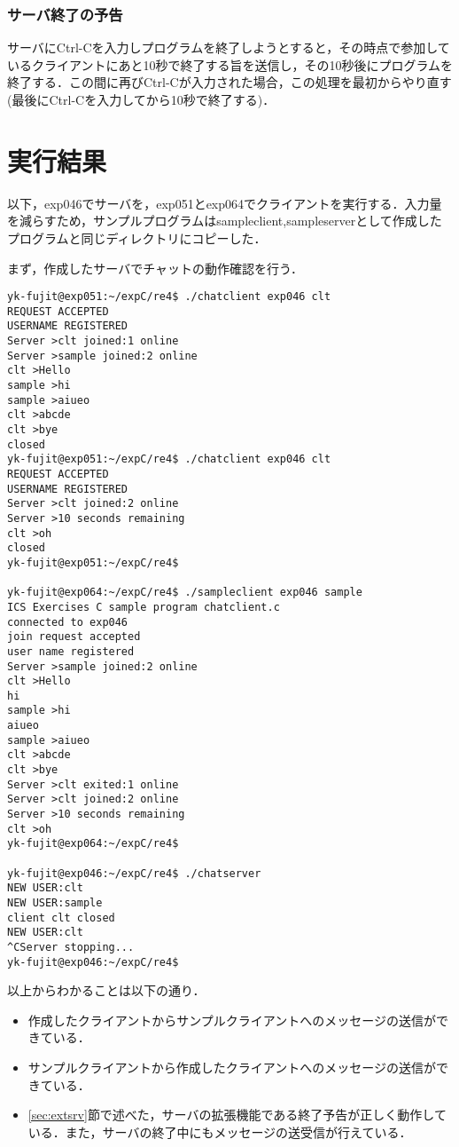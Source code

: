 \documentclass[a4j,10pt,titlepage]{jsarticle}
\begin{document}
\subsubsection{サーバ終了の予告}
サーバにCtrl-Cを入力しプログラムを終了しようとすると，その時点で参加しているクライアントにあと10秒で終了する旨を送信し，その10秒後にプログラムを終了する．この間に再びCtrl-Cが入力された場合，この処理を最初からやり直す(最後にCtrl-Cを入力してから10秒で終了する)．

\section{実行結果}
以下，exp046でサーバを，exp051とexp064でクライアントを実行する．入力量を減らすため，サンプルプログラムはsampleclient,sampleserverとして作成したプログラムと同じディレクトリにコピーした．

まず，作成したサーバでチャットの動作確認を行う．
\begin{verbatim}
yk-fujit@exp051:~/expC/re4$ ./chatclient exp046 clt
REQUEST ACCEPTED
USERNAME REGISTERED
Server >clt joined:1 online
Server >sample joined:2 online
clt >Hello
sample >hi
sample >aiueo
clt >abcde
clt >bye
closed
yk-fujit@exp051:~/expC/re4$ ./chatclient exp046 clt
REQUEST ACCEPTED
USERNAME REGISTERED
Server >clt joined:2 online
Server >10 seconds remaining
clt >oh
closed
yk-fujit@exp051:~/expC/re4$ 

yk-fujit@exp064:~/expC/re4$ ./sampleclient exp046 sample
ICS Exercises C sample program chatclient.c
connected to exp046
join request accepted
user name registered
Server >sample joined:2 online
clt >Hello
hi
sample >hi
aiueo
sample >aiueo
clt >abcde
clt >bye
Server >clt exited:1 online
Server >clt joined:2 online
Server >10 seconds remaining
clt >oh
yk-fujit@exp064:~/expC/re4$ 

yk-fujit@exp046:~/expC/re4$ ./chatserver 
NEW USER:clt
NEW USER:sample
client clt closed
NEW USER:clt
^CServer stopping...
yk-fujit@exp046:~/expC/re4$ 
\end{verbatim}
以上からわかることは以下の通り．
\begin{itemize}
  \item 作成したクライアントからサンプルクライアントへのメッセージの送信ができている．
  \item サンプルクライアントから作成したクライアントへのメッセージの送信ができている．
  \item \ref{sec:extsrv}節で述べた，サーバの拡張機能である終了予告が正しく動作している．また，サーバの終了中にもメッセージの送受信が行えている．
\end{itemize}
\end{document}
